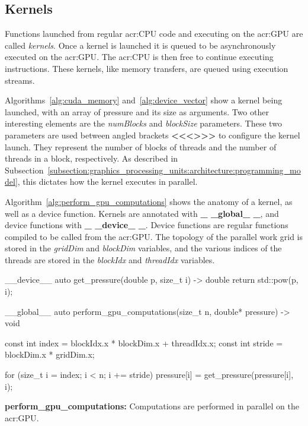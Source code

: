 \subsection{Kernels}\label{subsection:graphics_processing_units:implementation:kernels}

Functions launched from regular \acrshort{acr:CPU} code and executing on the \acrshort{acr:GPU} are
called \textit{kernels}. Once a kernel is launched it is queued to be asynchronously executed on the
\acrshort{acr:GPU}. The \acrshort{acr:CPU} is then free to continue executing instructions. These
kernels, like memory transfers, are queued using execution streams.

Algorithms~\ref{alg:cuda_memory} and~\ref{alg:device_vector} show a kernel being launched, with an
array of pressure and its size as arguments. Two other interesting elements are the
\textit{numBlocks} and \textit{blockSize} parameters. These two parameters are used between angled
brackets \textbf{<\negmedspace<\negmedspace<\thickspace>\negmedspace>\negmedspace>} to
configure the kernel launch. They represent the number of blocks of threads and the number of
threads in a block, respectively. As described in
Subsection~\ref{subsection:graphics_processing_units:architecture:programming_model}, this dictates
how the kernel executes in parallel.

Algorithm~\ref{alg:perform_gpu_computations} shows the anatomy of a kernel, as well as a device
function. Kernels are annotated with \textbf{\_ \_global\_ \_}, and device functions with
\textbf{\_ \_device\_ \_}. Device functions are regular functions compiled to be called from the
\acrshort{acr:GPU}. The topology of the parallel work grid is stored in the \textit{gridDim} and
\textit{blockDim} variables, and the various indices of the threads are stored in the
\textit{blockIdx} and \textit{threadIdx} variables.

\begin{algorithm}[H]
    \begin{cuda}
		__device__ 
		auto get_pressure(double p, size_t i) -> double {
			return std::pow(p, i);
		}

		__global__
		auto perform_gpu_computations(size_t n, double* pressure) -> void {
			const int index = blockIdx.x * blockDim.x + threadIdx.x;
			const int stride = blockDim.x * gridDim.x;

			for (size_t i = index; i < n; i += stride) {
				pressure[i] = get_pressure(pressure[i], i);
			}
		}\end{cuda}
\caption{\textbf{perform\_gpu\_computations:} Computations are performed in parallel on the \acrshort{acr:GPU}.}\label{alg:perform_gpu_computations}
\end{algorithm}

